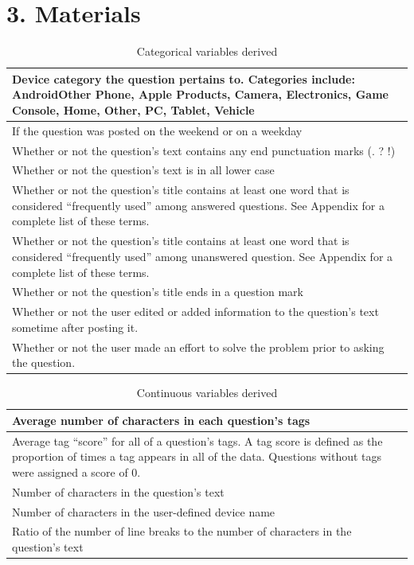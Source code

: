 \documentclass{article}
\begin{document}

\section*{3. Materials}

\begin{table}[!htbp]
\centering
\begin{tabular}{|p{10cm}|}
  \hline
  Device category the question pertains to. Categories include: Android\/Other Phone, Apple Products, Camera, Electronics, Game Console, Home, Other, PC, Tablet, Vehicle \\ \hline
  If the question was posted on the weekend or on a weekday \\ \hline
  Whether or not the question's text contains any end punctuation marks (. ? !) \\ \hline
  Whether or not the question's text is in all lower case \\ \hline
  Whether or not the question's title contains at least one word that is considered ``frequently used'' among answered questions. See Appendix for a complete list of these terms. \\ \hline
  Whether or not the question's title contains at least one word that is considered ``frequently used'' among unanswered question. See Appendix for a complete list of these terms. \\ \hline
  Whether or not the question's title ends in a question mark \\ \hline
  Whether or not the user edited or added information to the question's text sometime after posting it. \\ \hline
  Whether or not the user made an effort to solve the problem prior to asking the question. \\ \hline
\end{tabular}
\caption{Categorical variables derived}
\label{table:categorical}
\end{table}

\begin{table}[!htbp]
\centering
\begin{tabular}{|p{10cm}|}
  \hline
  Average number of characters in each question's tags\\ \hline
  Average tag ``score'' for all of a question's tags. A tag score is defined as the proportion of times a tag appears in all of the data. Questions without tags were assigned a score of 0. \\ \hline
  Number of characters in the question's text \\ \hline
  Number of characters in the user-defined device name \\ \hline
  Ratio of the number of line breaks to the number of characters in the question's text \\ \hline
\end{tabular}
\caption{Continuous variables derived}
\label{table:continuous}
\end{table}
\end{document}
